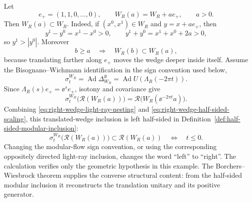 \begin{example}
\label{ex:right-wedge-half-sided-sign}
Let
\[
  e_+=(1,1,0,\ldots,0),
  \qquad
  W_R(a)=W_R+a e_+,\qquad a>0 .
\]
Then \(W_R(a)\subset W_R\).  Indeed, if
\((x^0,x^1)\in W_R\) and \(y=x+a e_+\), then
\[
  y^1-y^0=x^1-x^0>0,\qquad
  y^1+y^0=x^1+x^0+2a>0,
\]
so \(y^1>|y^0|\).  Moreover
\begin{equation}
  b\ge a\quad\Longrightarrow\quad W_R(b)\subset W_R(a),
  \label{eq:right-wedge-light-ray-nesting}
\end{equation}
because translating farther along \(e_+\) moves the wedge deeper inside
itself.  Assume the Bisognano--Wichmann identification in the sign convention
used below,
\[
  \sigma_t^{W_R}
  =
  \operatorname{Ad}\Delta_{W_R}^{\ii t}
  =
  \operatorname{Ad}U(\Lambda_R(-2\pi t)).
\]
Since \(\Lambda_R(s)e_+=\ee^s e_+\), isotony and covariance give
\begin{equation}
  \sigma_t^{W_R}\bigl(\mathcal R(W_R(a))\bigr)
  =
  \mathcal R\bigl(W_R(\ee^{-2\pi t}a)\bigr).
  \label{eq:right-wedge-half-sided-scaling}
\end{equation}
Combining \eqref{eq:right-wedge-light-ray-nesting} and
\eqref{eq:right-wedge-half-sided-scaling}, this translated-wedge inclusion is
left half-sided in Definition~\ref{def:half-sided-modular-inclusion}:
\[
  \sigma_t^{W_R}\bigl(\mathcal R(W_R(a))\bigr)
  \subset
  \mathcal R(W_R(a))
  \quad\Longleftrightarrow\quad
  t\le0 .
\]
Changing the modular-flow sign convention, or using the corresponding
oppositely directed light-ray inclusion, changes the word ``left'' to
``right''.  The calculation verifies only the geometric hypothesis in this
example.  The Borchers--Wiesbrock theorem supplies the converse structural
content: from the half-sided modular inclusion it reconstructs the
translation unitary and its positive generator.
\end{example}

